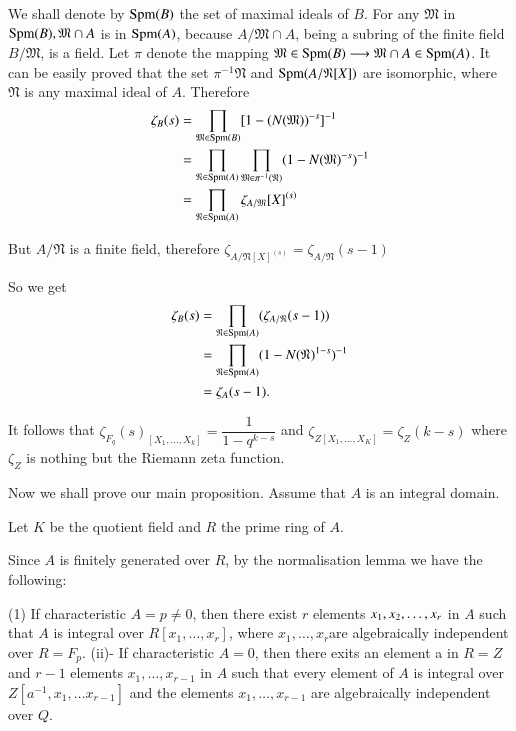 We shall denote by $\operatorname{Spm}(B)$ the set of maximal ideals of $B$. For any
$\mathfrak{M}$ in $\operatorname{Spm}(B), \mathfrak{M}\cap A$ is in $\operatorname{Spm} (A)$,
because  $A/ \mathfrak{M} \cap A$, being a subring of the finite field
$B/\mathfrak{M}$, is a field.  Let  $\pi$ denote the mapping
$\mathfrak{M} \in \operatorname{Spm}(B) \longrightarrow \mathfrak{M}\cap A \in
\operatorname{Spm}(A)$. It can be easily proved that the set $\pi^{-1}\mathfrak{N}$
and $\operatorname{Spm}(A/ \mathfrak{N}[X])$ are isomorphic,  where $\mathfrak{N}$ is
any maximal ideal of $A$. Therefore 
\begin{align*}
  \zeta_B(s) &= \prod_{\mathfrak{M}\in \operatorname{Spm} (B)} [1- (N(\mathfrak{M}))^{-s}]^{-1}\\
  &= \prod_{\mathfrak{N}\in \operatorname{Spm} (A)}  \prod_{\mathfrak{M}\in
    \pi^{-1}(\mathfrak{N})} ( 1-N(\mathfrak{M})^{-s})^{-1}\\ 
  &= \prod_{\mathfrak{N}\in \operatorname{Spm} (A)} \zeta_{A/ \mathfrak{M}}[X]^{(s)}
\end{align*}\pageoriginale

But $A/ \mathfrak{N}$ is a finite  field,  therefore $\zeta_{A/
  \mathfrak{N}[X]^{(s)}} = \zeta_{A/ \mathfrak{N}}(s-1)$ 

So we get 
\begin{align*}
  \zeta_B(s) &= \prod_{\mathfrak{N}\in \operatorname{Spm} (A)} (\zeta_{A/ \mathfrak{N}}(s-1))\\
  &=\prod_{\mathfrak{N}\in \operatorname{Spm} (A)} (1-N(\mathfrak{N})^{1-s})^{-1}\\
  &=\zeta_A (s-1).
\end{align*}

It follows that $\zeta_{F_{q}} (s)_{[X_{1}, \ldots,  X_{k}]}=
\dfrac{1}{1-q^{k-s}}$ and $\zeta_{Z [X_1,  \ldots,  X_K]} = \zeta_Z
(k-s)$ where  $\zeta_Z$ is nothing but the Riemann zeta function. 

Now we shall prove our main proposition.  Assume that $A$ is an
integral domain. 

Let $K$ be the quotient field and $R$ the prime ring of $A$. 

Since $A$ is  finitely generated over $R$, by the normalisation lemma
we have the following: 

(1) If characteristic $A= p \neq 0$, then there  exist $r$ elements
$x_1, x_2, \ldots,\break  x_r$ in $A$ such that $A$ is integral over $R[x_1
 ,  \ldots,  x_r]$, where $x_1,  \ldots,  x_r$\pageoriginale are algebraically
independent over $R= F_p$. (ii)- If characteristic $A=0$, then there
exits an element a in $R =Z$ and $r-1$ elements  $x_1, \ldots, 
x_{r-1}$ in $A$ such that every  element of $A$ is integral over $Z [
  a^{-1}, x_1, \ldots x_{r-1} ]$  and the elements $x_1, \ldots, 
x_{r-1}$ are algebraically independent over $Q$.  

